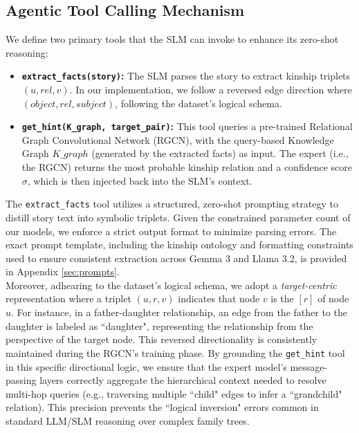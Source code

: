 \documentclass[
]{ceurart}
\begin{document}
\subsection{Agentic Tool Calling Mechanism}
We define two primary tools that the SLM can invoke to enhance its zero-shot reasoning:
\begin{itemize}
    \item \textbf{\texttt{extract\_facts(story)}:} The SLM parses the story to extract kinship triplets $(u, rel, v)$. In our implementation, we follow a reversed edge direction where $(object, rel, subject)$, following the dataset’s logical schema.
    \item \textbf{\texttt{get\_hint(K\_graph, target\_pair)}:} This tool queries a pre-trained Relational Graph Convolutional Network (RGCN), with the query-based Knowledge Graph $K\_graph$ (generated by the
    extracted facts) as input.  The expert (i.e., the RGCN) returns the most probable kinship relation and a confidence score $\sigma$, which is then injected back into the SLM's context.
\end{itemize}
The \texttt{extract\_facts} tool utilizes a structured, zero-shot prompting strategy to distill story text into symbolic triplets. Given the constrained parameter count of our models, we enforce a strict output format to minimize parsing errors. The exact prompt template, including the kinship ontology and formatting constraints used to ensure consistent extraction across Gemma 3 and Llama 3.2, is provided in Appendix \ref{sec:prompts}.\\
Moreover, adhearing to the dataset's logical schema, we adopt a \textit{target-centric} representation where a triplet $(u, r, v)$ indicates that node $v$ is the $[r]$ of node $u$. For instance, in a father-daughter relationship, an edge from the father to the daughter is labeled as ``daughter", representing the relationship from the perspective of the target node. This reversed directionality is consistently maintained during the RGCN's training phase. By grounding the \texttt{get\_hint} tool in this specific directional logic, we ensure that the expert model's message-passing layers correctly aggregate the hierarchical context needed to resolve multi-hop queries (e.g., traversing multiple ``child" edges to infer a ``grandchild" relation). This precision prevents the ``logical inversion" errors common in standard LLM/SLM reasoning over complex family trees.
\end{document}
